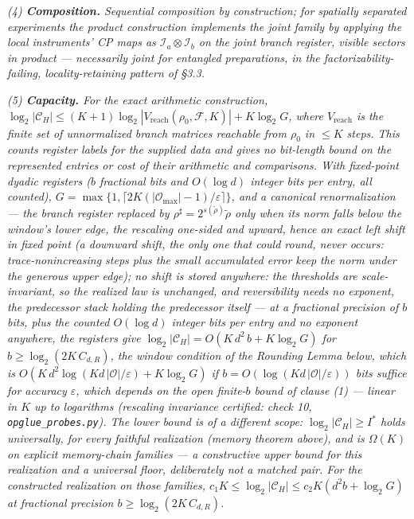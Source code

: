 \documentclass[
]{article}
\begin{document}
\emph{(4) \textbf{Composition.} Sequential composition by construction;
for spatially separated experiments the product construction implements
the joint family by applying the local instruments' CP maps as
\(\mathcal{I}_a \otimes \mathcal{I}_b\) on the joint branch register,
visible sectors in product --- necessarily joint for entangled
preparations, in the factorizability-failing, locality-retaining pattern
of §3.3.}

\emph{(5) \textbf{Capacity.} For the exact arithmetic construction,
\(\log_2|\mathcal{C}_H| \leq (K{+}1)\log_2|V_{\mathrm{reach}}(\rho_0,\mathcal{F}, K)| + K \log_2 G\),
where \(V_{\mathrm{reach}}\) is the finite set of unnormalized branch
matrices reachable from \(\rho_0\) in \(\leq K\) steps. This counts
register labels for the supplied data and gives no bit-length bound on
the represented entries or cost of their arithmetic and comparisons.
With fixed-point dyadic registers (\(b\) fractional bits and
\(O(\log d)\) integer bits per entry, all counted),
\(G = \max\{1,\lceil 2K(|\mathcal{O}_{\max}|{-}1)/\varepsilon \rceil\}\),
and a canonical renormalization --- the branch register replaced by
\(\rho^{\sharp} = 2^{s(\tilde\rho)}\tilde\rho\) only when its norm falls
below the window's lower edge, the rescaling one-sided and upward, hence
an exact left shift in fixed point (a downward shift, the only one that
could round, never occurs: trace-nonincreasing steps plus the small
accumulated error keep the norm under the generous upper edge); no shift
is stored anywhere: the thresholds are scale-invariant, so the realized
law is unchanged, and reversibility needs no exponent, the predecessor
stack holding the predecessor itself --- at a fractional precision of
\(b\) bits, plus the counted \(O(\log d)\) integer bits per entry and no
exponent anywhere, the registers give
\(\log_2|\mathcal{C}_H| = O\!\left(K\, d^2\, b + K \log_2 G\right)\) for
\(b \geq \log_2(2K\, C_{d,R})\), the window condition of the Rounding
Lemma below, which is
\(O\!\left(K\, d^2 \log(K d\, |\mathcal{O}|/\varepsilon) + K \log_2 G\right)\)
if \(b = O(\log(K d\, |\mathcal{O}|/\varepsilon))\) bits suffice for
accuracy \(\varepsilon\), which depends on the open finite-\(b\) bound
of clause (1) --- linear in \(K\) up to logarithms (rescaling invariance
certified: check 10, \texttt{opglue\_probes.py}). The lower bound is of
a different scope: \(\log_2|\mathcal{C}_H| \geq I^*\) holds universally,
for every faithful realization (memory theorem above), and is
\(\Omega(K)\) on explicit memory-chain families --- a constructive upper
bound for this realization and a universal floor, deliberately not a
matched pair. For the constructed realization on those families,
\(c_1 K \leq \log_2|\mathcal{C}_H| \leq c_2 K \left(d^2 b + \log_2 G\right)\)
at fractional precision \(b \geq \log_2(2K\, C_{d,R})\).}
\end{document}
